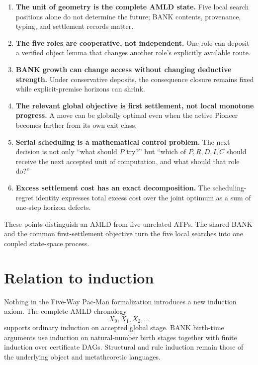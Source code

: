 \documentclass[11pt]{article}
\theoremstyle{remark}
\begin{document}
\begin{enumerate}[leftmargin=2.1em]
\item \textbf{The unit of geometry is the complete AMLD state.} Five local search positions alone do not determine the future; BANK contents, provenance, typing, and settlement records matter.

\item \textbf{The five roles are cooperative, not independent.} One role can deposit a verified object lemma that changes another role's explicitly available route.

\item \textbf{BANK growth can change access without changing deductive strength.} Under conservative deposits, the consequence closure remains fixed while explicit-premise horizons can shrink.

\item \textbf{The relevant global objective is first settlement, not local monotone progress.} A move can be globally optimal even when the active Pioneer becomes farther from its own exit class.

\item \textbf{Serial scheduling is a mathematical control problem.} The next decision is not only ``what should $P$ try?'' but ``which of $P,R,D,I,C$ should receive the next accepted unit of computation, and what should that role do?''

\item \textbf{Excess settlement cost has an exact decomposition.} The scheduling-regret identity expresses total excess cost over the joint optimum as a sum of one-step horizon defects.
\end{enumerate}

These points distinguish an AMLD from five unrelated ATPs. The shared BANK and the common first-settlement objective turn the five local searches into one coupled state-space process.

\section{Relation to induction}

Nothing in the Five-Way Pac-Man formalization introduces a new induction axiom. The complete AMLD chronology
\[
X_0,X_1,X_2,\ldots
\]
supports ordinary induction on accepted global stage. BANK birth-time arguments use induction on natural-number birth stages together with finite induction over certificate DAGs. Structural and rule induction remain those of the underlying object and metatheoretic languages.
\end{document}
